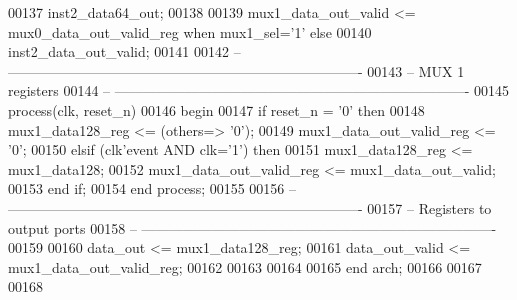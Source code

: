 \begin{DoxyCode}
00137                                     inst2\_data64\_out;
00138                     
00139 \textcolor{vhdlchar}{mux1_data_out_valid}         \textcolor{vhdlchar}{<=} \textcolor{vhdlchar}{mux0_data_out_valid_reg} \textcolor{keywordflow}{when} \textcolor{vhdlchar}{mux1_sel}\textcolor{vhdlchar}{=}\textcolor{vhdlchar}{'}\textcolor{vhdllogic}{}\textcolor{vhdllogic}{1}\textcolor{vhdlchar}{'} \textcolor{keywordflow}{else} 
00140                                     inst2\_data\_out\_valid;
00141                                     
00142 \textcolor{keyword}{-- ----------------------------------------------------------------------------}
00143 \textcolor{keyword}{-- MUX 1 registers}
00144 \textcolor{keyword}{-- ----------------------------------------------------------------------------                                 }
00145 \textcolor{keywordflow}{process}(clk, reset_n)
00146 \textcolor{vhdlkeyword}{begin }
00147     \textcolor{keywordflow}{if} \textcolor{vhdlchar}{reset_n} \textcolor{vhdlchar}{=} \textcolor{vhdlchar}{'}\textcolor{vhdllogic}{}\textcolor{vhdllogic}{0}\textcolor{vhdlchar}{'} \textcolor{keywordflow}{then} 
00148         \textcolor{vhdlchar}{mux1_data128_reg}            \textcolor{vhdlchar}{<=} \textcolor{vhdlchar}{(}\textcolor{keywordflow}{others}\textcolor{vhdlchar}{=}\textcolor{vhdlchar}{>} \textcolor{vhdlchar}{'}\textcolor{vhdllogic}{}\textcolor{vhdllogic}{0}\textcolor{vhdlchar}{'}\textcolor{vhdlchar}{)};
00149         \textcolor{vhdlchar}{mux1_data_out_valid_reg} \textcolor{vhdlchar}{<=} \textcolor{vhdlchar}{'}\textcolor{vhdllogic}{}\textcolor{vhdllogic}{0}\textcolor{vhdlchar}{'};
00150     \textcolor{keywordflow}{elsif} \textcolor{vhdlchar}{(}\textcolor{vhdlchar}{clk}\textcolor{vhdlchar}{'}\textcolor{vhdlkeyword}{event} \textcolor{keywordflow}{AND} \textcolor{vhdlchar}{clk}\textcolor{vhdlchar}{=}\textcolor{vhdlchar}{'}\textcolor{vhdllogic}{}\textcolor{vhdllogic}{1}\textcolor{vhdlchar}{'}\textcolor{vhdlchar}{)} \textcolor{keywordflow}{then} 
00151         \textcolor{vhdlchar}{mux1_data128_reg}            \textcolor{vhdlchar}{<=} \textcolor{vhdlchar}{mux1_data128};
00152         \textcolor{vhdlchar}{mux1_data_out_valid_reg} \textcolor{vhdlchar}{<=} \textcolor{vhdlchar}{mux1_data_out_valid};
00153     \textcolor{keywordflow}{end} \textcolor{keywordflow}{if};
00154 \textcolor{keywordflow}{end} \textcolor{keywordflow}{process};
00155 
00156 \textcolor{keyword}{-- ----------------------------------------------------------------------------}
00157 \textcolor{keyword}{-- Registers to output ports}
00158 \textcolor{keyword}{-- ----------------------------------------------------------------------------}
00159 
00160 \textcolor{vhdlchar}{data_out}        \textcolor{vhdlchar}{<=} \textcolor{vhdlchar}{mux1_data128_reg};
00161 \textcolor{vhdlchar}{data_out_valid} \textcolor{vhdlchar}{<=}   \textcolor{vhdlchar}{mux1_data_out_valid_reg};
00162 
00163 
00164 
00165 \textcolor{keywordflow}{end} \textcolor{vhdlchar}{arch};   
00166 
00167 
00168 
\end{DoxyCode}
